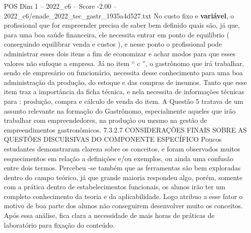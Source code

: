\begin{textsample}{POS Dim 1 – 2022\_c6 – Score -2.00 – 2022\_c6/enade\_2022\_tec\_gastr\_1935a4d527.txt}
No custo fixo e \textbf{variável}, o profissional que for empreender precisa de saber bem definido quais são, já que, para uma boa saúde financeira, ele necessita entrar em ponto de equilíbrio ( conseguindo equilibrar venda e custos ), e nesse ponto o profissional pode administrar esses dois itens a fim de economizar e achar modos para que esses valores não sufoque a empresa.
Já no item “ c ”, o gastrônomo que irá trabalhar, sendo ele empresário ou funcionário, necessita desse conhecimento para uma boa administração da produção, do estoque e das compras de insumos.
Tanto que esse item traz a importância da ficha técnica, e nela necessita de informações técnicas para : produção, compra e cálculo de venda do item.
A Questão 5 tratava de um assunto relevante na formação do Gastrônomo, especialmente aqueles que irão trabalhar com empreendedores, na produção ou mesmo na gestão de empreendimentos gastronômicos. 7.3.2.7 CONSIDERAÇÕES FINAIS SOBRE AS QUESTÕES DISCURSIVAS DO COMPONENTE ESPECÍFICO Poucos estudantes demonstraram clareza sobre os conceitos, e foram observados muitos esquecimentos em relação a definições e/ou exemplos, ou ainda uma confusão entre dois termos.
Percebeu -se também que as ferramentas são bem exploradas dentro do campo teórico, já que grande maioria respondeu algo, porém, somente com a prática dentro de estabelecimentos funcionais, os alunos irão ter um completo conhecimento da teoria e da aplicabilidade.
Logo atribuo a esse fator o motivo de boa parte dos alunos não conseguirem desenvolver muito os conceitos.
Após essa análise, fica clara a necessidade de mais horas de práticas de laboratório para fixação do conteúdo.

\end{textsample}

